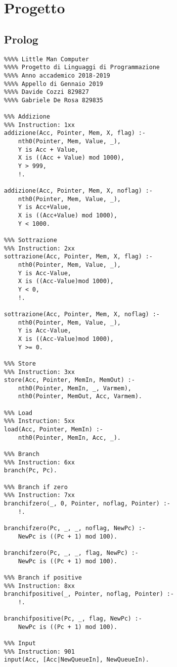 \documentclass[a4paper,12pt, oneside]{book}
\begin{document}
\chapter{Progetto}
\section{Prolog}
\begin{verbatim}
%%%% Little Man Computer
%%%% Progetto di Linguaggi di Programmazione
%%%% Anno accademico 2018-2019
%%%% Appello di Gennaio 2019
%%%% Davide Cozzi 829827
%%%% Gabriele De Rosa 829835

%%% Addizione
%%% Instruction: 1xx 
addizione(Acc, Pointer, Mem, X, flag) :- 
    nth0(Pointer, Mem, Value, _),
    Y is Acc + Value,
    X is ((Acc + Value) mod 1000),
    Y > 999,
    !.

addizione(Acc, Pointer, Mem, X, noflag) :- 
    nth0(Pointer, Mem, Value, _),
    Y is Acc+Value,
    X is ((Acc+Value) mod 1000),
    Y < 1000.

%%% Sottrazione
%%% Instruction: 2xx
sottrazione(Acc, Pointer, Mem, X, flag) :- 
    nth0(Pointer, Mem, Value, _),
    Y is Acc-Value,
    X is ((Acc-Value)mod 1000),
    Y < 0,
    !.

sottrazione(Acc, Pointer, Mem, X, noflag) :- 
    nth0(Pointer, Mem, Value, _),
    Y is Acc-Value,
    X is ((Acc-Value)mod 1000),
    Y >= 0.

%%% Store
%%% Instruction: 3xx
store(Acc, Pointer, MemIn, MemOut) :- 
    nth0(Pointer, MemIn, _, Varmem),
    nth0(Pointer, MemOut, Acc, Varmem).

%%% Load
%%% Instruction: 5xx
load(Acc, Pointer, MemIn) :- 
    nth0(Pointer, MemIn, Acc, _).

%%% Branch
%%% Instruction: 6xx
branch(Pc, Pc).

%%% Branch if zero
%%% Instruction: 7xx
branchifzero(_, 0, Pointer, noflag, Pointer) :- 
    !.

branchifzero(Pc, _, _, noflag, NewPc) :- 
    NewPc is ((Pc + 1) mod 100).

branchifzero(Pc, _, _, flag, NewPc) :- 
    NewPc is ((Pc + 1) mod 100).

%%% Branch if positive
%%% Instruction: 8xx
branchifpositive(_, Pointer, noflag, Pointer) :- 
    !.

branchifpositive(Pc, _, flag, NewPc) :- 
    NewPc is ((Pc + 1) mod 100).

%%% Input
%%% Instruction: 901
input(Acc, [Acc|NewQueueIn], NewQueueIn).


\end{verbatim}
\end{document}
